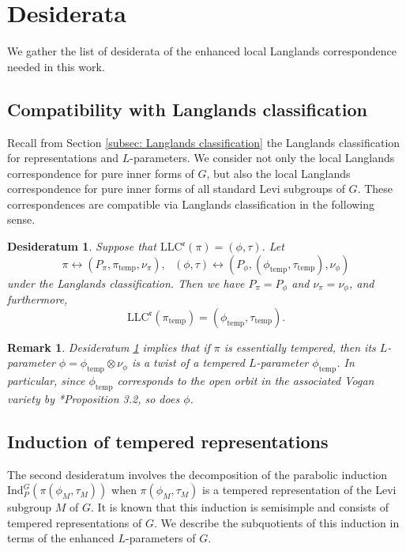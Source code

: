 \documentclass[11pt,letterpaper]{amsart}
\newcommand{\Ind}{\mathrm{Ind}}
\newcommand{\LLC}{\mathrm{LLC}}
\newtheorem{remark}[thm]{Remark}
\newtheorem{desideratum}[thm]{Desideratum}
\renewcommand{\1}{\mathbbm{1}}
\numberwithin{equation}{section}
\begin{document}
{\section{Desiderata}
We gather the list of desiderata of the enhanced local Langlands correspondence needed in this work.

\subsection{Compatibility with Langlands classification}\label{subsec: Compatibility with Langlands classification}
Recall from Section \ref{subsec: Langlands classification} the Langlands classification for representations and $L$-parameters. We consider not only the local Langlands correspondence for pure inner forms of $G$, but also the local Langlands correspondence for pure inner forms of all standard Levi subgroups of $G$. These correspondences are compatible via Langlands classification in the following sense.
\begin{desideratum}\label{desideratum: Langlands classification}
Suppose that $\LLC^{\mathfrak{e}}(\pi) = (\phi, \tau)$. Let 
\[\pi \leftrightarrow (P_{\pi}, \pi_{\mathrm{temp}}, \nu_{\pi}),\ \ \ (\phi, \tau) \leftrightarrow (P_{\phi}, (\phi_{\mathrm{temp}}, \tau_{\mathrm{temp}}), \nu_{\phi})\] 
under the Langlands classification. Then we have $P_{\pi} = P_{\phi}$ and $\nu_{\pi} = \nu_{\phi}$, and furthermore,
\[
    \LLC^{\mathfrak{e}}(\pi_{\mathrm{temp}}) = (\phi_{\mathrm{temp}}, \tau_{\mathrm{temp}}).
\]
\end{desideratum}

\begin{remark}\label{rmk LC tempered}
Desideratum \ref{desideratum: Langlands classification} implies that if $\pi$ is essentially tempered, then its $L$-parameter $\phi= \phi_{\mathrm{temp}} \otimes \nu_{\phi}$ is a twist of a tempered $L$-parameter $\phi_{ \mathrm{temp}}$. In particular, since $\phi_{\mathrm{temp}}$ corresponds to the open orbit in the associated Vogan variety by \cite{cunningham2024whittakernormalizationpadicabvpackets}*{Proposition 3.2}, so does $\phi$.
\end{remark}


\subsection{Induction of tempered representations}\label{subsec: Induction of tempered representations}
The second desideratum involves the decomposition of the parabolic induction $\Ind_P^G (\pi(\phi_M,\tau_M))$ when $\pi(\phi_M,\tau_M)$ is a tempered representation of the Levi subgroup $M$ of $G$. It is known that this induction is semisimple and consists of tempered representations of $G$. We describe the subquotients of this induction in terms of the enhanced $L$-parameters of $G$.

}
\end{document}

